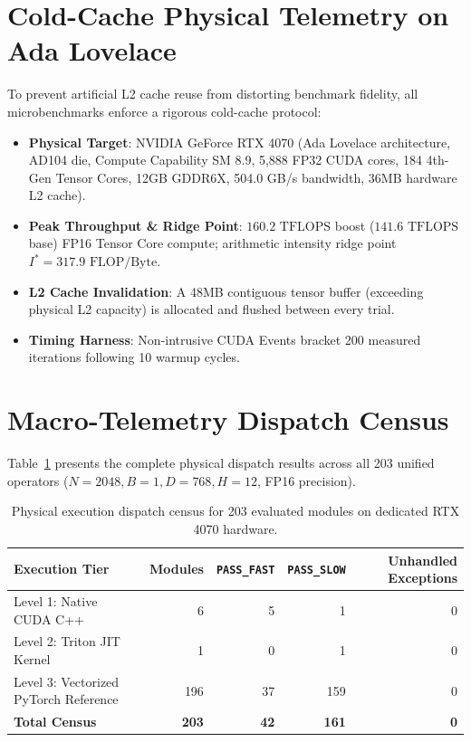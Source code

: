 \documentclass{article}
\newcommand{\passfast}{\texttt{PASS\_FAST}}
\newcommand{\passslow}{\texttt{PASS\_SLOW}}
\begin{document}
\section{Cold-Cache Physical Telemetry on Ada Lovelace}
\label{sec:hw_telemetry}

To prevent artificial L2 cache reuse from distorting benchmark fidelity, all microbenchmarks enforce a rigorous cold-cache protocol:
\begin{itemize}
    \item \textbf{Physical Target}: NVIDIA GeForce RTX 4070 (Ada Lovelace architecture, AD104 die, Compute Capability SM 8.9, 5,888 FP32 CUDA cores, 184 4th-Gen Tensor Cores, 12GB GDDR6X, 504.0 GB/s bandwidth, 36MB hardware L2 cache).
    \item \textbf{Peak Throughput \& Ridge Point}: $160.2\text{ TFLOPS}$ boost ($141.6\text{ TFLOPS}$ base) FP16 Tensor Core compute; arithmetic intensity ridge point $I^* = 317.9\text{ FLOP/Byte}$.
    \item \textbf{L2 Cache Invalidation}: A 48MB contiguous tensor buffer (exceeding physical L2 capacity) is allocated and flushed between every trial.
    \item \textbf{Timing Harness}: Non-intrusive CUDA Events bracket 200 measured iterations following 10 warmup cycles.
\end{itemize}

\section{Macro-Telemetry Dispatch Census}
\label{sec:census}

Table~\ref{tab:mlsys_dispatch} presents the complete physical dispatch results across all 203 unified operators ($N=2048, B=1, D=768, H=12$, FP16 precision).

\begin{table}[ht]
\centering
\caption{Physical execution dispatch census for 203 evaluated modules on dedicated RTX 4070 hardware.}
\label{tab:mlsys_dispatch}
\begin{tabular}{lrrrr}
\toprule
\textbf{Execution Tier} & \textbf{Modules} & \textbf{\passfast{}} & \textbf{\passslow{}} & \textbf{Unhandled Exceptions} \\
\midrule
Level 1: Native CUDA C++ & 6 & 5 & 1 & 0 \\
Level 2: Triton JIT Kernel & 1 & 0 & 1 & 0 \\
Level 3: Vectorized PyTorch Reference & 196 & 37 & 159 & 0 \\
\midrule
\textbf{Total Census} & \textbf{203} & \textbf{42} & \textbf{161} & \textbf{0} \\
\bottomrule
\end{tabular}
\end{table}
\end{document}
